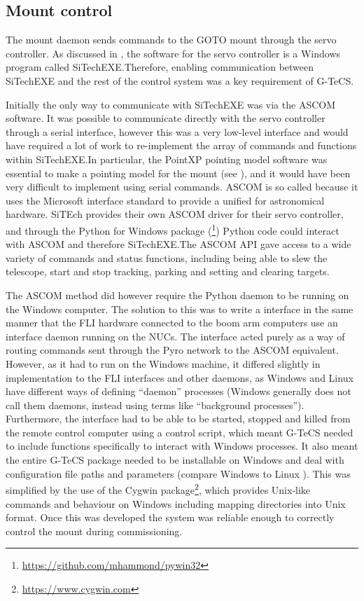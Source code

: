 \subsection{Mount control}
\label{sec:mount}
\begin{colsection}

The mount daemon sends commands to the GOTO mount through the  servo controller. As discussed in , the software for the servo controller is a Windows program called SiTechEXE.\@ Therefore, enabling communication between SiTechEXE and the rest of the control system was a key requirement of G-TeCS.\@

Initially the only way to communicate with SiTechEXE was via the ASCOM software. It was possible to communicate directly with the servo controller through a serial interface, however this was a very low-level interface and would have required a lot of work to re-implement the array of commands and functions within SiTechEXE.\@ In particular, the PointXP pointing model software was essential to make a pointing model for the mount (see ), and it would have been very difficult to implement using serial commands. ASCOM is so called because it uses the Microsoft  interface standard to provide a unified  for astronomical hardware. SiTEch provides their own ASCOM driver for their servo controller, and through the Python for Windows package (\footnote{\url{https://github.com/mhammond/pywin32}}) Python code could interact with ASCOM and therefore SiTechEXE.\@ The ASCOM API gave access to a wide variety of commands and status functions, including being able to slew the telescope, start and stop tracking, parking and setting and clearing targets.

The ASCOM method did however require the Python daemon to be running on the Windows computer. The solution to this was to write a  interface in the same manner that the FLI hardware connected to the boom arm computers use an interface daemon running on the NUCs. The  interface acted purely as a way of routing commands sent through the Pyro network to the ASCOM equivalent. However, as it had to run on the Windows machine, it differed slightly in implementation to the FLI interfaces and other daemons, as Windows and Linux have different ways of defining ``daemon'' processes (Windows generally does not call them daemons, instead using terms like ``background processes''). Furthermore, the interface had to be able to be started, stopped and killed from the remote control computer using a  control script, which meant G-TeCS needed to include functions specifically to interact with Windows processes. It also meant the entire G-TeCS package needed to be installable on Windows and deal with configuration file paths and parameters (compare Windows  to Linux ). This was simplified by the use of the Cygwin package\footnote{\url{https://www.cygwin.com}}, which provides Unix-like commands and behaviour on Windows including mapping directories into Unix format. Once this was developed the system was reliable enough to correctly control the mount during commissioning.


\end{colsection}
